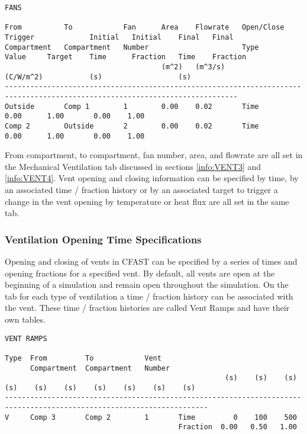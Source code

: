 \begin{lstlisting}[basicstyle=\tiny]
FANS

From          To            Fan      Area    Flowrate   Open/Close  Trigger             Initial   Initial    Final   Final
Compartment   Compartment   Number                      Type        Value     Target    Time      Fraction   Time    Fraction
                                     (m^2)   (m^3/s)                (C/W/m^2)           (s)                  (s)
-----------------------------------------------------------------------------------------------------------------------------
Outside       Comp 1        1        0.00    0.02       Time                            0.00      1.00       0.00    1.00
Comp 2        Outside       2        0.00    0.02       Time                            0.00      1.00       0.00    1.00
\end{lstlisting}
From compartment, to compartment, fan number, area, and flowrate are all set in the Mechanical Ventilation tab discussed in sections \ref{info:VENT3} and \ref{info:VENT4}.  Vent opening and closing information can be specified by time, by an associated time / fraction history or by an associated target to trigger a change in the vent opening by temperature or heat flux are all set in the same tab.


\subsubsection{Ventilation Opening Time Specifications}
Opening and closing of vents in CFAST can be specified by a series of times and opening fractions for a specified vent. By default, all vents are open at the beginning of a simulation and remain open throughout the simulation. On the tab for each type of ventilation a time / fraction history can be associated with the vent. These time / fraction histories are called Vent Ramps and have their own tables.
\begin{lstlisting}[basicstyle=\tiny]
VENT RAMPS

Type  From         To            Vent
      Compartment  Compartment   Number
                                                    (s)    (s)    (s)    (s)    (s)    (s)    (s)    (s)    (s)    (s)
----------------------------------------------------------------------------------------------------------------------
V     Comp 3       Comp 2        1       Time         0    100    500
                                         Fraction  0.00   0.50   1.00
\end{lstlisting}

